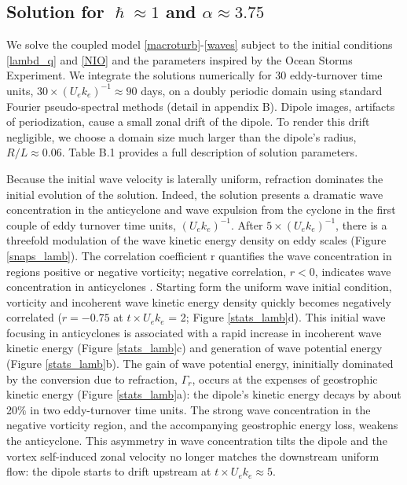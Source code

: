 \documentclass{jfm}
\begin{document}
\subsection{Solution for $\hslash \approx 1$ and $\alpha \approx 3.75$}
We solve the coupled model \eqref{macroturb}-\eqref{waves} subject to the
initial conditions \eqref{lambd_q} and \eqref{NIO} and the parameters inspired
by the Ocean Storms Experiment. We integrate the solutions numerically
 for $30$ eddy-turnover time units,
$30\times (U_e k_e)^{-1}\approx 90$ days, on a
doubly periodic domain using standard Fourier pseudo-spectral methods (detail in appendix B).
Dipole images, artifacts of periodization,
cause a small zonal drift of the dipole. To render this drift negligible, we
choose a domain size much larger than the dipole's radius, $R/L \approx 0.06$.
Table B.1 provides a full description of solution parameters.

Because the initial wave velocity is laterally uniform, refraction dominates
the initial evolution of the solution.
Indeed, the solution presents a dramatic wave concentration
in the anticyclone and wave expulsion from the cyclone in the first couple of
eddy turnover time units, $(U_e k_e)^{-1}$. After $5 \times (U_e k_e)^{-1}$, there
is a threefold modulation of the wave kinetic energy density on eddy scales
(Figure \ref{snaps_lamb}). The  correlation coefficient
\beq
\label{corr_r}
r  {}\com
\eeq
quantifies the wave concentration in regions positive or negative vorticity;
negative correlation, $r<0$, indicates wave concentration in anticyclones
\citep{danioux_etal2015}. Starting form the uniform wave initial condition,
vorticity and incoherent wave kinetic energy density
quickly becomes negatively correlated ($r=-0.75$ at $t\times U_e k_e$ = 2;
Figure \ref{stats_lamb}d). This initial wave focusing in anticyclones is associated
with a rapid increase in incoherent wave kinetic energy (Figure \ref{stats_lamb}c)
and generation of wave potential energy (Figure \ref{stats_lamb}b). The gain of
wave potential energy, ininitially dominated by the conversion due to refraction,
$\Gamma_r$,
 occurs at the expenses of geostrophic kinetic energy
(Figure \ref{stats_lamb}a):
the dipole's kinetic energy decays by about 20$\%$ in two eddy-turnover time units.
The strong wave concentration in the negative vorticity region, and the accompanying
geostrophic energy loss, weakens the anticyclone.  This asymmetry in wave concentration
tilts the dipole and the vortex self-induced zonal velocity no longer matches the
downstream uniform flow: the dipole starts to drift upstream at $t\times U_e
k_e \approx 5$.
\end{document}
